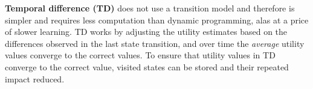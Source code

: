 \textbf{Temporal difference (TD)} does not use a transition model and therefore
is simpler and requires less computation than dynamic programming, alas at a
price of slower learning. TD works by adjusting the utility estimates based on
the differences observed in the last state transition, and over time the
\textit{average} utility values converge to the correct values. To ensure that
utility values in TD converge to the correct value, visited states can be
stored and their repeated impact reduced. \parencite{Russell2010ai+modern}


\subsubsection{}


